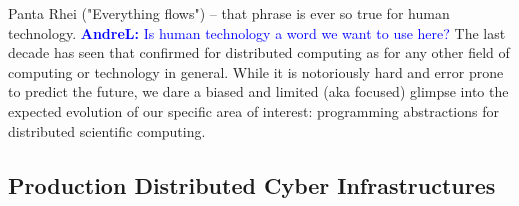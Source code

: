 \documentclass{article}
\newcommand{\B}[1]{\textbf{#1}}
\newcommand{\alnote}[1]{{\textcolor{blue}{    \B{AndreL:  } #1 }}}
\newcommand{\ownote}[1]{{\textcolor{Brown}{   \B{Ole:     } #1 }}}
\newcommand{\alnote}[1]{}
\newcommand{\ownote}[1]{}
\begin{document}
 Panta Rhei ("Everything flows") -- that phrase is ever so true for
 human technology.\alnote{Is human technology a word we want to use here?}  
 The last decade has seen that confirmed for
 distributed computing as for any other field of computing or
 technology in general.  While it is notoriously hard and error prone
 to predict the future, we dare a biased and limited (aka focused)
 glimpse into the expected evolution of our specific area of interest:
 programming abstractions for distributed scientific computing. 


 \subsection{Production Distributed Cyber Infrastructures}


\end{document}
